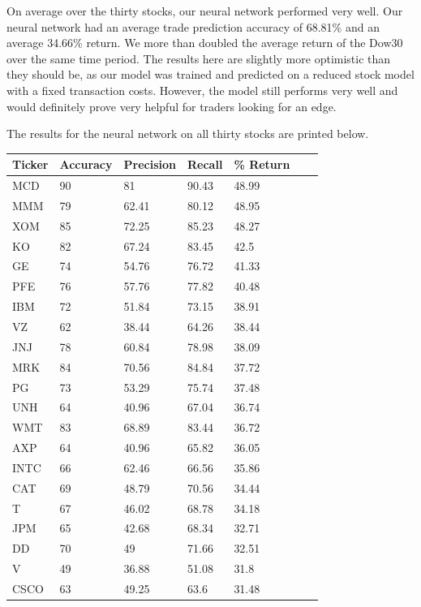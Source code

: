 \documentclass{article}
\begin{document}
On average over the thirty stocks, our neural network performed very well. Our neural network had an average trade prediction accuracy of 68.81\% and an average 34.66\% return. We more than doubled the average return of the Dow30 over the same time period. The results here are slightly more optimistic than they should be, as our model was trained and predicted on a reduced stock model with a fixed transaction costs. However, the model still performs very well and would definitely prove very helpful for traders looking for an edge.

The results for the neural network on all thirty stocks are printed below.

\begin{table}[h!]
  \begin{tabular}{@{}lllllll@{}}
    \toprule
    Ticker & Accuracy & Precision & Recall & \% Return & \\ \midrule
    MCD & 90 & 81 & 90.43 & 48.99 & \\
    MMM & 79 & 62.41 & 80.12 & 48.95 & \\
    XOM & 85 & 72.25 & 85.23 & 48.27 & \\
    KO & 82 & 67.24 & 83.45 & 42.5 & \\
    GE & 74 & 54.76 & 76.72 & 41.33 & \\
    PFE & 76 & 57.76 & 77.82 & 40.48 & \\
    IBM & 72 & 51.84 & 73.15 & 38.91 & \\
    VZ & 62 & 38.44 & 64.26 & 38.44 & \\
    JNJ & 78 & 60.84 & 78.98 & 38.09 & \\
    MRK & 84 & 70.56 & 84.84 & 37.72 & \\
    PG & 73 & 53.29 & 75.74 & 37.48 & \\
    UNH & 64 & 40.96 & 67.04 & 36.74 & \\
    WMT & 83 & 68.89 & 83.44 & 36.72 & \\
    AXP & 64 & 40.96 & 65.82 & 36.05 & \\
    INTC & 66 & 62.46 & 66.56 & 35.86 & \\
    CAT & 69 & 48.79 & 70.56 & 34.44 & \\
    T & 67 & 46.02 & 68.78 & 34.18 & \\
    JPM & 65 & 42.68 & 68.34 & 32.71 & \\
    DD & 70 & 49 & 71.66 & 32.51 & \\
    V & 49 & 36.88 & 51.08 & 31.8 & \\
    CSCO & 63 & 49.25 & 63.6 & 31.48 & \\

\end{tabular}
\end{table}
\end{document}
